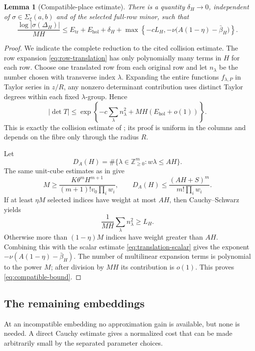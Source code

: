 \documentclass[11pt]{article}
\newcommand{\NN}{\mathbb Z_{\ge 0}}
\newcommand{\Comp}{\Sigma_{\xi}(a,b)}
\newtheorem{lemma}[theorem]{Lemma}
\theoremstyle{definition}
\theoremstyle{remark}
\numberwithin{equation}{section}
\begin{document}
\begin{lemma}[Compatible-place estimate]\label{lem:compatible}
There is a quantity $\delta_H\to0$, independent of
$\sigma\in\Comp$ and of the selected full-row minor, such that
\begin{equation}\label{eq:compatible-bound}
 \frac{\log|\sigma(\Delta_H)|}{MH}
 \le E_{\mathrm{tr}}+E_{\mathrm{hol}}+\delta_H
 +\max\left\{-cL_H,
 -\nu\bigl(A(1-\eta)-\bar\beta_H\bigr)\right\}.
\end{equation}
\end{lemma}

\begin{proof}
We indicate the complete reduction to the cited collision estimate.
The row expansion \eqref{eq:row-translation} has only polynomially many
terms in $H$ for each row.  Choose one translated row from each original
row and let $n_\lambda$ be the number chosen with transverse index
$\lambda$.  Expanding the entire functions $f_{\lambda,P}$ in Taylor
series in $z/R$, any nonzero determinant contribution uses distinct
Taylor degrees within each fixed $\lambda$-group.  Hence
\[
 |\det T|
 \le\exp\left\{-c\sum_\lambda n_\lambda^2
 +MH(E_{\mathrm{hol}}+o(1))\right\}.
\]
This is exactly the collision estimate of
\cite[Section~5.2]{LiuJiangZhang2026}; its proof is uniform in the
columns and depends on the fibre only through the radius $R$.

Let
\[
 D_A(H)=\#\{\lambda\in\NN^m:w\lambda\le AH\}.
\]
The same unit-cube estimates as in \cite[Section~6]{LiuJiangZhang2026}
give
\[
 M\ge\frac{K\theta^mH^{m+1}}
 {(m+1)!v_0\prod_iw_i},
 \qquad
 D_A(H)\le\frac{(AH+S)^m}{m!\prod_iw_i}.
\]
If at least $\eta M$ selected indices have weight at most $AH$, then
Cauchy--Schwarz yields
\[
 \frac1{MH}\sum_\lambda n_\lambda^2\ge L_H.
\]
Otherwise more than $(1-\eta)M$ indices have weight greater than $AH$.
Combining this with the scalar estimate
\eqref{eq:translation-scalar} gives the exponent
$-\nu(A(1-\eta)-\bar\beta_H)$.  The number of multilinear expansion
terms is polynomial to the power $M$; after division by $MH$ its
contribution is $o(1)$.  This proves \eqref{eq:compatible-bound}.
\end{proof}

\subsection{The remaining embeddings}

At an incompatible embedding no approximation gain is available, but
none is needed.  A direct Cauchy estimate gives a normalized cost that
can be made arbitrarily small by the separated parameter choices.
\end{document}
